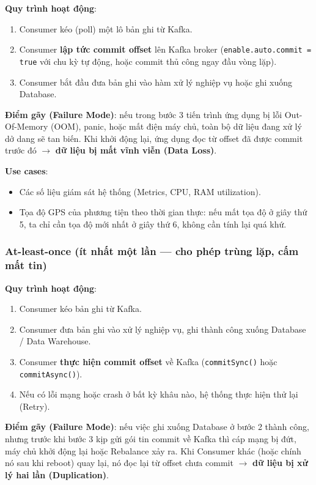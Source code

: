 \documentclass[12pt]{article}
\begin{document}
\textbf{Quy trình hoạt động}:
\begin{enumerate}
    \item Consumer kéo (poll) một lô bản ghi từ Kafka.
    \item Consumer \textbf{lập tức commit offset} lên Kafka broker (\texttt{enable.auto.commit = true} với chu kỳ tự động, hoặc commit thủ công ngay đầu vòng lặp).
    \item Consumer bắt đầu đưa bản ghi vào hàm xử lý nghiệp vụ hoặc ghi xuống Database.
\end{enumerate}

\textbf{Điểm gãy (Failure Mode)}: nếu trong bước 3 tiến trình ứng dụng bị lỗi Out-Of-Memory (OOM), panic, hoặc mất điện máy chủ, toàn bộ dữ liệu đang xử lý dở dang sẽ tan biến. Khi khởi động lại, ứng dụng đọc từ offset đã được commit trước đó $\rightarrow$ \textbf{dữ liệu bị mất vĩnh viễn (Data Loss)}.

\textbf{Use cases}:
\begin{itemize}
    \item Các số liệu giám sát hệ thống (Metrics, CPU, RAM utilization).
    \item Tọa độ GPS của phương tiện theo thời gian thực: nếu mất tọa độ ở giây thứ 5, ta chỉ cần tọa độ mới nhất ở giây thứ 6, không cần tính lại quá khứ.
\end{itemize}

\subsubsection{At-least-once (ít nhất một lần --- cho phép trùng lặp, cấm mất tin)}

\textbf{Quy trình hoạt động}:
\begin{enumerate}
    \item Consumer kéo bản ghi từ Kafka.
    \item Consumer đưa bản ghi vào xử lý nghiệp vụ, ghi thành công xuống Database / Data Warehouse.
    \item Consumer \textbf{thực hiện commit offset} về Kafka (\texttt{commitSync()} hoặc \texttt{commitAsync()}).
    \item Nếu có lỗi mạng hoặc crash ở bất kỳ khâu nào, hệ thống thực hiện thử lại (Retry).
\end{enumerate}

\textbf{Điểm gãy (Failure Mode)}: nếu việc ghi xuống Database ở bước 2 thành công, nhưng trước khi bước 3 kịp gửi gói tin commit về Kafka thì cáp mạng bị đứt, máy chủ khởi động lại hoặc Rebalance xảy ra. Khi Consumer khác (hoặc chính nó sau khi reboot) quay lại, nó đọc lại từ offset chưa commit $\rightarrow$ \textbf{dữ liệu bị xử lý hai lần (Duplication)}.
\end{document}
